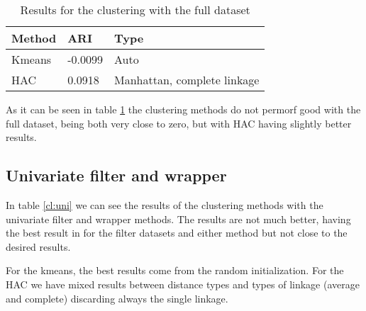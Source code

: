 \documentclass[a4paper,11pt]{article}
\begin{document}
\begin{table}
\centering
\begin{tabular}{|l|l|l|}
\hline

\textbf{Method} & \textbf{ARI} & \textbf{Type} \\ \hline
Kmeans & -0.0099 & Auto \\ \hline
HAC & 0.0918 & Manhattan, complete linkage \\ \hline

\end{tabular}
\caption{Results for the clustering with the full dataset}
\label{cl:full}
\end{table}

As it can be seen in table \ref{cl:full} the clustering methods do not permorf good with the full dataset, being both very close to zero, but with HAC having slightly better results.

\subsection{Univariate filter and wrapper}

In table \ref{cl:uni} we can see the results of the clustering methods with the univariate filter and wrapper methods. The results are not much better, having the best result in for the filter datasets and either method but not close to the desired results.

For the kmeans, the best results come from the random initialization. For the HAC we have mixed results between distance types and types of linkage (average and complete) discarding always the single linkage.
\end{document}
